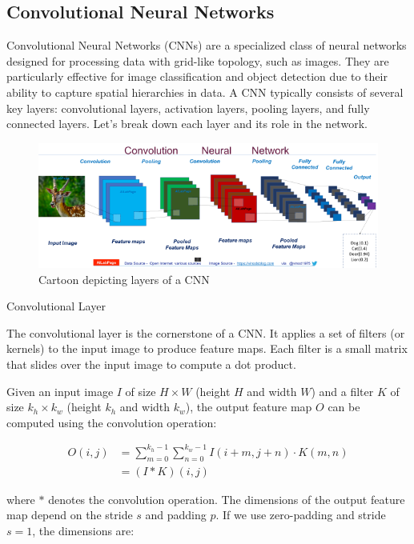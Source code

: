 \subsection{Convolutional Neural Networks}

Convolutional Neural Networks (CNNs) are a specialized class of neural networks designed for processing data with grid-like topology, such as images.
They are particularly effective for image classification and object detection due to their ability to capture spatial hierarchies in data.
A CNN typically consists of several key layers: convolutional layers, activation layers, pooling layers, and fully connected layers.
Let's break down each layer and its role in the network.

\begin{figure}[H]
  \centering
  \includegraphics[width=120mm]{figures/cnn.png}
  \caption{Cartoon depicting layers of a CNN}
  \label{cnn}
\end{figure}

Convolutional Layer

The convolutional layer is the cornerstone of a CNN.
It applies a set of filters (or kernels) to the input image to produce feature maps.
Each filter is a small matrix that slides over the input image to compute a dot product.

Given an input image \( I \) of size \( H \times W \) (height \( H \) and width \( W \)) and a filter \( K \) of size \( k_h \times k_w \) (height \( k_h \) and width \( k_w \)), the output feature map \( O \) can be computed using the convolution operation:

\begin{align}
  O(i, j) &= \sum_{m=0}^{k_h-1} \sum_{n=0}^{k_w-1} I(i+m, j+n) \cdot K(m, n) \\
          &= (I * K)(i, j)
\end{align}

where \( * \) denotes the convolution operation.
The dimensions of the output feature map depend on the stride \( s \) and padding \( p \).
If we use zero-padding and stride \( s = 1 \), the dimensions are:

